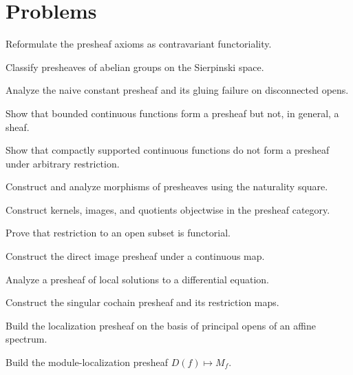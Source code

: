 \section{Problems}
\ifdefined\FullProblemDossiers

\else
\begin{problem}
Reformulate the presheaf axioms as contravariant functoriality.
\end{problem}
\begin{problem}
Classify presheaves of abelian groups on the Sierpinski space.
\end{problem}
\begin{problem}
Analyze the naive constant presheaf and its gluing failure on disconnected opens.
\end{problem}
\begin{problem}
Show that bounded continuous functions form a presheaf but not, in general, a sheaf.
\end{problem}
\begin{problem}
Show that compactly supported continuous functions do not form a presheaf under arbitrary restriction.
\end{problem}
\begin{problem}
Construct and analyze morphisms of presheaves using the naturality square.
\end{problem}
\begin{problem}
Construct kernels, images, and quotients objectwise in the presheaf category.
\end{problem}
\begin{problem}
Prove that restriction to an open subset is functorial.
\end{problem}
\begin{problem}
Construct the direct image presheaf under a continuous map.
\end{problem}
\begin{problem}
Analyze a presheaf of local solutions to a differential equation.
\end{problem}
\begin{problem}
Construct the singular cochain presheaf and its restriction maps.
\end{problem}
\begin{problem}
Build the localization presheaf on the basis of principal opens of an affine spectrum.
\end{problem}
\begin{problem}
Build the module-localization presheaf $D(f)\mapsto M_f$.
\end{problem}

